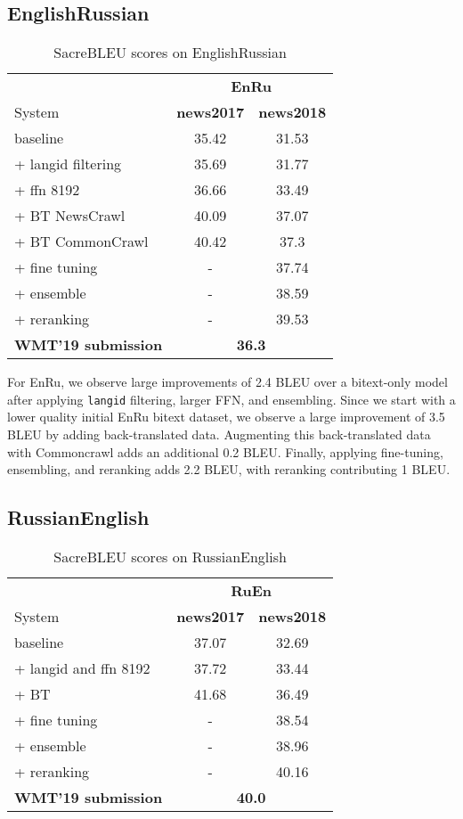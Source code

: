 \documentclass[11pt,a4paper]{article}
\newcommand{\entoru}{EnRu}
\newcommand{\rutoen}{RuEn}
\newcommand{\enbiru}{EnRu}
\begin{document}
\subsection{EnglishRussian}
\begin{table}[t]
\centering
\begin{tabular}{lcc}
\toprule
& \multicolumn{2}{c}{\textbf{\entoru{}}} \\
System & \bf news2017 & \bf news2018 \\ \midrule
baseline & 35.42 & 31.53 \\ 
+ langid filtering & 35.69 & 31.77 \\
+ ffn 8192 & 36.66 &  33.49\\
+ BT NewsCrawl & 40.09 &  37.07 \\
+ BT CommonCrawl & 40.42 & 37.3 \\
+ fine tuning & - & 37.74 \\
+ ensemble & -  & 38.59 \\
+ reranking & -  & 39.53 \\
\midrule
\bf WMT'19 submission & \multicolumn{2}{c}{\bf 36.3} \\ 
\bottomrule
\end{tabular}
\caption{SacreBLEU scores on EnglishRussian }
\label{tab:ablation_enru}
\end{table}

For \entoru{}, we observe large improvements of 2.4 BLEU over a bitext-only model after applying \texttt{langid} filtering, larger FFN, and ensembling. 
Since we start with a lower quality initial \enbiru{} bitext dataset, we observe a large improvement of 3.5 BLEU by adding back-translated data.
Augmenting this back-translated data with Commoncrawl adds an additional 0.2 BLEU.
Finally, applying fine-tuning, ensembling, and reranking adds 2.2 BLEU, with reranking contributing 1 BLEU.

\subsection{RussianEnglish}
\begin{table}[t]
\centering
\begin{tabular}{lcc}
\toprule
& \multicolumn{2}{c}{\textbf{\rutoen{}}} \\
System & \bf news2017 & \bf news2018 \\ \midrule
baseline & 37.07 & 32.69 \\ 
+ langid and ffn 8192 & 37.72 & 33.44 \\
+ BT & 41.68 & 36.49 \\
+ fine tuning & - & 38.54 \\
+ ensemble & - & 38.96 \\
+ reranking & -  & 40.16 \\
\midrule
\bf WMT'19 submission & \multicolumn{2}{c}{\bf 40.0} \\ 
\bottomrule
\end{tabular}
\caption{SacreBLEU scores on RussianEnglish }
\label{tab:ablation_ruen}
\end{table}
\end{document}
